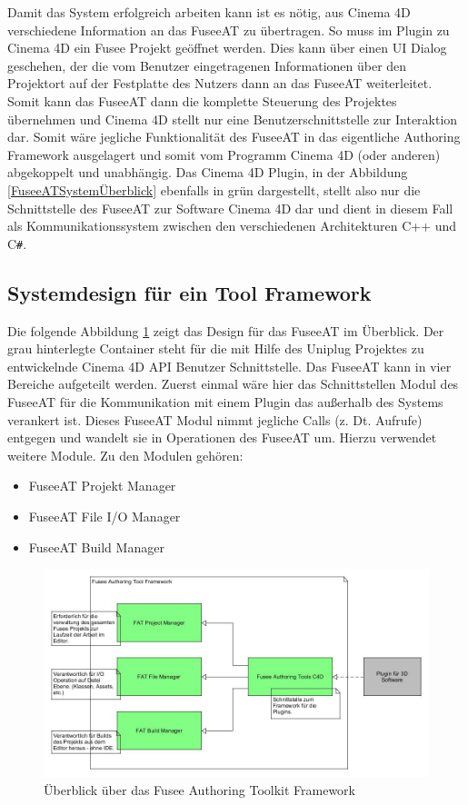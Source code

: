 \documentclass[pagesize, paper=a4, fontsize=12pt, titlepage=true, headings=small, headnosepline, abstractoff, liststotoc, nochapterprefix, plainheadsepline, twoside]{scrreprt}
\newcommand{\CS}{C\texttt{\#}}
\begin{document}
Damit das System erfolgreich arbeiten kann ist es nötig, aus Cinema 4D verschiedene Information an das FuseeAT zu übertragen. So muss im Plugin zu Cinema 4D ein Fusee Projekt geöffnet werden. Dies kann über einen UI Dialog geschehen, der die vom Benutzer eingetragenen Informationen über den Projektort auf der Festplatte des Nutzers dann an das FuseeAT weiterleitet. Somit kann das FuseeAT dann die komplette Steuerung des Projektes übernehmen und Cinema 4D stellt nur eine Benutzerschnittstelle zur Interaktion dar. Somit wäre jegliche Funktionalität des FuseeAT in das eigentliche Authoring Framework ausgelagert und somit vom Programm Cinema 4D (oder anderen) abgekoppelt und unabhängig. Das Cinema 4D Plugin, in der Abbildung \ref{FuseeATSystemÜberblick} ebenfalls in grün dargestellt, stellt also nur die Schnittstelle des FuseeAT zur Software Cinema 4D dar und dient in diesem Fall als Kommunikationssystem zwischen den verschiedenen Architekturen C++ und \CS.

\subsection{Systemdesign für ein Tool Framework}
Die folgende Abbildung \ref{FrameworkÜberblick} zeigt das Design für das FuseeAT im Überblick. Der grau hinterlegte Container steht für die mit Hilfe des Uniplug Projektes zu entwickelnde Cinema 4D API Benutzer Schnittstelle. Das FuseeAT kann in vier Bereiche aufgeteilt werden. Zuerst einmal wäre hier das Schnittstellen Modul des FuseeAT für die Kommunikation mit einem Plugin das außerhalb des Systems verankert ist. Dieses FuseeAT Modul nimmt jegliche Calls (z. Dt. Aufrufe) entgegen und wandelt sie in Operationen des FuseeAT um. Hierzu verwendet weitere Module. Zu den Modulen gehören:
\begin{itemize}
\item FuseeAT Projekt Manager
\item FuseeAT File I/O Manager
\item FuseeAT Build Manager
\end{itemize}

\begin{figure}[ht]
	\centering
	\includegraphics[width=\linewidth]{Bilder/Ueberblick_Framework.jpg}
	\caption{Überblick über das Fusee Authoring Toolkit Framework}
	\label{FrameworkÜberblick}
\end{figure}
\end{document}
